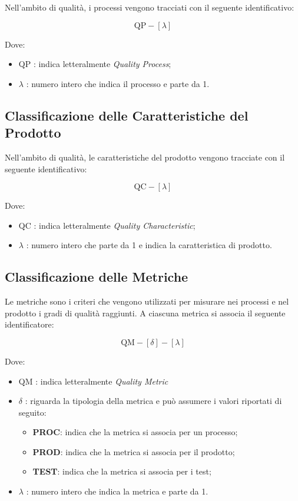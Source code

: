 			Nell'ambito di qualità, i processi vengono tracciati con il seguente identificativo:

			\[
					\text{QP}-[\lambda]
			\]

			Dove:

			\begin{itemize}
				\item QP : indica letteralmente \textit{Quality Process};
				\item \(\lambda\) : numero intero che indica il processo e parte da 1.
			\end{itemize}

	\subsection{Classificazione delle Caratteristiche del Prodotto}

		Nell'ambito di qualità, le caratteristiche del prodotto vengono tracciate con il seguente identificativo:

		\[
				\text{QC}-[\lambda]
		\]

		Dove:

		\begin{itemize}
			\item QC : indica letteralmente \textit{Quality Characteristic};
			\item \(\lambda\) : numero intero che parte da 1 e indica la caratteristica di prodotto.
		\end{itemize}

		\subsection{Classificazione delle Metriche}

		Le metriche sono i criteri che vengono utilizzati per misurare nei processi e nel prodotto i gradi di qualità raggiunti. A ciascuna metrica si associa il seguente identificatore:

		\[
				\text{QM}-[\delta]-[\lambda]
		\]

		Dove:

		\begin{itemize}
			\item QM : indica letteralmente \textit{Quality Metric}
			\item \(\delta\) : riguarda la tipologia della metrica e può assumere i valori riportati di seguito:
				\begin{itemize}
					\item \textbf{PROC}: indica che la metrica si associa per un processo;
					\item \textbf{PROD}: indica che la metrica si associa per il prodotto;
					\item \textbf{TEST}: indica che la metrica si associa per i test;
				\end{itemize}
			\item \(\lambda\) : numero intero che indica la metrica e parte da 1.
		\end{itemize}

